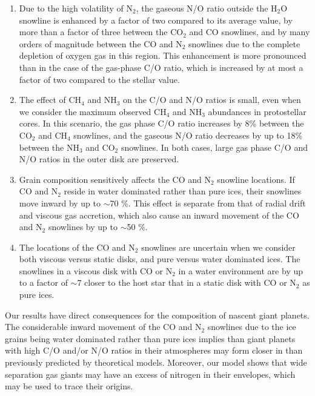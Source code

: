 \documentclass[apj]{emulateapj}
\begin{document}
\begin{enumerate}

\item Due to the high volatility of N$_2$, the gaseous N/O ratio outside the H$_2$O snowline is enhanced by a factor of two compared to its average value, by more than a factor of three between the CO$_2$ and CO snowlines, and by many orders of magnitude between the CO and N$_2$ snowlines due to the complete depletion of oxygen gas in this region. This enhancement is more pronounced than in the case of the gas-phase C/O ratio, which is increased by at most a factor of two compared to the stellar value. %

\item The effect of CH$_4$ and NH$_3$ on the C/O and N/O ratios is small, even when we consider the maximum observed CH$_4$ and NH$_3$ abundances in protostellar cores. In this scenario, the gas phase C/O ratio increases by 8\% between the CO$_2$ and CH$_4$ snowlines, and  the gaseous N/O ratio decreases by up to 18\% between the NH$_3$ and CO$_2$ snowlines. In both cases, large gas phase C/O and N/O ratios in the outer disk are preserved.

\item Grain composition sensitively affects the CO and N$_2$ snowline locations. If CO and N$_2$ reside in water dominated rather than pure ices, their snowlines move inward by up to $\sim$70 \%. This effect is separate from that of radial drift and viscous gas accretion, which also cause an inward movement of the CO and N$_2$ snowlines by up to $\sim$50 \%. 

\item The locations of the CO and N$_2$ snowlines are uncertain when we consider both viscous versus static disks, and pure versus water dominated ices. The snowlines in a viscous disk with CO or N$_2$ in a water environment are by up to a factor of $\sim$7 closer to the host star that in a static disk with CO or N$_2$ as pure ices. 

\end{enumerate}

Our results have direct consequences for the composition of nascent giant planets. The considerable inward movement of the CO and N$_2$ snowlines due to the ice grains being water dominated rather than pure ices implies than giant planets with high C/O and/or N/O ratios in their atmospheres may form closer in than previously predicted by theoretical models. Moreover, our model shows that wide separation gas giants may have an excess of nitrogen in their envelopes, which may be used to trace their origins. %
\end{document}
